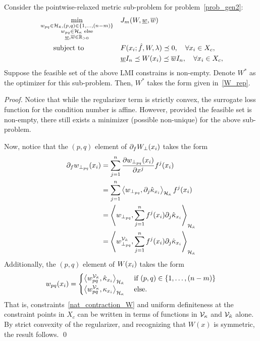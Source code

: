 \begin{theorem}\label{thm:rep_W}
Consider the pointwise-relaxed metric sub-problem for problem~\eqref{prob_gen2}:
\begin{align}
&\min_{\substack{w_{pq} \in \mathcal{H}_{\hat{\kappa}}, (p,q) \in \{1,\ldots,(n-m)\} \\ w_{pq} \in \mathcal{H}_{\kappa} \text{ else} \\ \underline{w},\overline{w} \in \mathbb{R}_{>0}}} && J_m(W,\underline{w},\overline{w})  \nonumber \\
&\qquad \text{subject to} && F(x_i; \hat{f}, W, \lambda) \preceq 0, \quad \forall x_i \in X_c, \label{lmi_pw2} \\
&\qquad && \underline{w} I_n \preceq W(x_i) \preceq \overline{w} I_n, \quad \forall x_i \in X_c, \label{lmi_pw3}
\end{align}
Suppose the feasible set of the above LMI constrains is non-empty. Denote $W^*$ as the optimizer for this sub-problem. Then, $W^*$ takes the form given in~\eqref{W_rep}.
\end{theorem}
\begin{proof}
Notice that while the regularizer term is strictly convex, the surrogate loss function for the condition number is affine. However, provided the feasible set is non-empty, there still exists a minimizer (possible non-unique) for the above sub-problem. 

Now, notice that the $(p,q)$ element of $\partial_{f} W_{\perp} (x_i)$ takes the form
\[
	\begin{split} 
		\partial_{f} w_{\perp_{pq}}(x_i) &=\sum_{j=1}^{n} \dfrac{\partial w_{\perp_{pq}} (x_i)}{\partial x^j} f^j (x_i) \\
								&= \sum_{j=1}^{n} \left\langle w_{\perp_{pq}}, \partial_{j}\hat{\kappa}_{x_i} \right\rangle_{\mathcal{H}_{\hat{\kappa}}} f^j(x_i) \\
								&= \left\langle w_{\perp_{pq}},  \sum_{j=1}^{n} f^j(x_i) \partial_{j}\hat{\kappa}_{x_i} \right\rangle_{\mathcal{H}_{\hat{\kappa}}} \\
								&= \left\langle w^{\mathcal{V}_{\hat{\kappa}}}_{\perp_{pq}},  \sum_{j=1}^{n} f^j(x_i) \partial_{j}\hat{\kappa}_{x_i} \right\rangle_{\mathcal{H}_{\hat{\kappa}}} 
	\end{split}
\]
Additionally, the $(p,q)$ element of $W(x_i)$ takes the form
\[
		w_{pq}(x_i) = \begin{cases}  \left\langle w^{\mathcal{V}_{\hat{\kappa}}}_{pq}, \hat{\kappa}_{x_i} \right\rangle_{\mathcal{H}_{\hat{\kappa}}} &\text{ if } (p,q) \in \{1,\ldots,(n-m)\} \\
						 	    \left\langle w^{\mathcal{V}_\kappa}_{pq}, \kappa_{x_i} \right\rangle_{\mathcal{H}_{\kappa}} &\text{ else.}
					\end{cases}
\]
That is, constraints~\eqref{nat_contraction_W} and uniform definiteness at the constraint points in $X_c$ can be written in terms of functions in $\mathcal{V}_\kappa$ and $\mathcal{V}_{\hat{\kappa}}$ alone. By strict convexity of the regularizer, and recognizing that $W(x)$ is symmetric, the result follows. \qed 
\end{proof}


